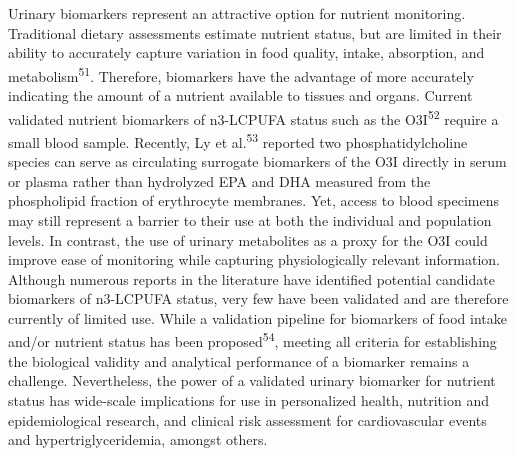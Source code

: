 \documentclass[journal=jacsat,manuscript=article]{achemso}
\begin{document}
Urinary biomarkers represent an attractive option for nutrient
monitoring. Traditional dietary assessments estimate nutrient status,
but are limited in their ability to accurately capture variation in food
quality, intake, absorption, and metabolism\textsuperscript{51}.
Therefore, biomarkers have the advantage of more accurately indicating
the amount of a nutrient available to tissues and organs. Current
validated nutrient biomarkers of n3-LCPUFA status such as the
O3I\textsuperscript{52} require a small blood sample. Recently, Ly et
al.\textsuperscript{53} reported two phosphatidylcholine species can
serve as circulating surrogate biomarkers of the O3I directly in serum
or plasma rather than hydrolyzed EPA and DHA measured from the
phospholipid fraction of erythrocyte membranes. Yet, access to blood
specimens may still represent a barrier to their use at both the
individual and population levels. In contrast, the use of urinary
metabolites as a proxy for the O3I could improve ease of monitoring
while capturing physiologically relevant information. Although numerous
reports in the literature have identified potential candidate biomarkers
of n3-LCPUFA status, very few have been validated and are therefore
currently of limited use. While a validation pipeline for biomarkers of
food intake and/or nutrient status has been
proposed\textsuperscript{54}, meeting all criteria for establishing the
biological validity and analytical performance of a biomarker remains a
challenge. Nevertheless, the power of a validated urinary biomarker for
nutrient status has wide-scale implications for use in personalized
health, nutrition and epidemiological research, and clinical risk
assessment for cardiovascular events and hypertriglyceridemia, amongst
others.
\end{document}

